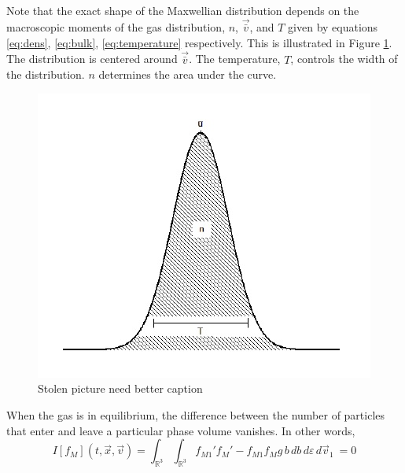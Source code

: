 \documentclass[12pt]{CSUNthesis}
\def\R{\mathbb{R}}
\newcommand{\vecx}{\vec{x}}
\newcommand{\vecv}{\vec{v}}
\newcommand{\bulkv}{\vec{\bar{v}}} %
\begin{document}
Note that the exact shape of the Maxwellian distribution depends on the macroscopic moments of the gas distribution, $n$, $\vec{\bar{v}}$, and $T$ given by equations \ref{eq:dens}, \ref{eq:bulk}, \ref{eq:temperature} respectively. This is illustrated in Figure \ref{fig:1d_maxwellian}. The distribution is centered around $\bulkv$. The temperature, $T$, controls the width of the distribution. $n$ determines the area under the curve.
\begin{figure}[h]
\centering
\includegraphics[scale=.5]{1D_Maxwellian}
\caption{Stolen picture need better caption}
\label{fig:1d_maxwellian}
\end{figure}

When the gas is in equilibrium, the difference between the number of particles that enter and leave a particular phase volume vanishes. In other words, 
\begin{equation*}
I[f_M](t,\vecx,\vecv) = \int_{\R^3} \int_{\R^3} f_{M1}'f_M' - f_{M1} f_M  g\, b\, db\, d\varepsilon\, d\vecv_1\ = 0
\end{equation*}
\end{document}
